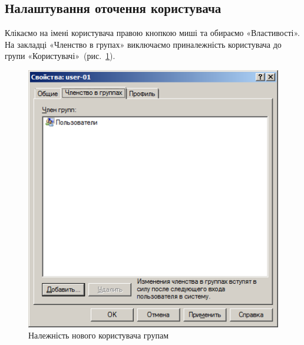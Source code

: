 \documentclass[
	a4paper,
	oneside,
	DIV = 12,
	fontsize = 13pt,
	headings = normal,
]{scrartcl}
\begin{document}

		\subsection{Налаштування оточення користувача}
			Клікаємо на імені користувача правою кнопкою миші та обираємо «Властивості». На закладці «Членство в групах» виключаємо приналежність користувача до групи «Користувачі»~(рис.~\ref{fig:user-environment-setting}).

			\begin{figure}[!htbp]
				\centering
				\includegraphics[height = 11.5\baselineskip]{../01-solution/y03s01-pcdiag-lab-08-p04-01.png}
				\caption{Належність нового користувача групам}
				\label{fig:user-environment-setting}
			\end{figure}
\end{document}
